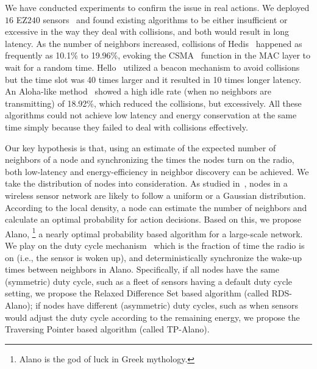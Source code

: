 We have conducted experiments to confirm the issue in real actions.
We deployed $16$ EZ$240$ sensors~\cite{huang2012easipled} and
found existing algorithms to be either insufficient or
excessive in the way they deal with collisions, and
both would result in long latency.
As the number of neighbors increased, collisions of 
Hedis~\cite{chen2015heterogeneous} happened as frequently as 10.1\% to
19.96\%, evoking the CSMA~\cite{bianchi1996performance} function in the MAC
layer to wait for a random time. Hello~\cite{sun2014hello} utilized a
beacon mechanism to avoid collisions but the time slot was 40 times
larger and it resulted in 10 times longer latency. 
An Aloha-like method~\cite{you2011aloha} showed a high idle rate (when no neighbors are
transmitting) of 18.92\%, which reduced the collisions, but
excessively.  %
All these algorithms could not achieve low latency and energy
conservation at the same time simply because they failed to deal with
collisions effectively.

Our key hypothesis is that, using an estimate of the expected number of
neighbors of a node and synchronizing the times the nodes turn on the
radio, %
both low-latency and energy-efficiency in neighbor discovery can be achieved. 
We take the distribution of nodes into consideration. As studied
in~\cite{wang2013gaussian}, nodes in a wireless sensor network are
likely to follow a uniform or a Gaussian distribution.
According to the local density, a node can estimate the number of
neighbors and calculate an optimal probability for action decisions.
Based on this, we propose Alano, \footnote{Alano is the god of luck in Greek mythology.}
a nearly optimal probability based algorithm for a large-scale network.
We play on the duty cycle mechanism~\cite{zhang2017performance} 
which is the fraction of time the radio is on
(i.e., the sensor is woken up), and deterministically
synchronize the wake-up times between neighbors in Alano.
Specifically, if all nodes have the same (symmetric) duty cycle, such as
a fleet of sensors having a default duty cycle setting, we propose the
Relaxed Difference Set based algorithm (called RDS-Alano); if nodes have
different (asymmetric) duty cycles, such as when sensors would adjust the duty
cycle according to the remaining energy, we propose the Traversing Pointer based
algorithm (called TP-Alano).


